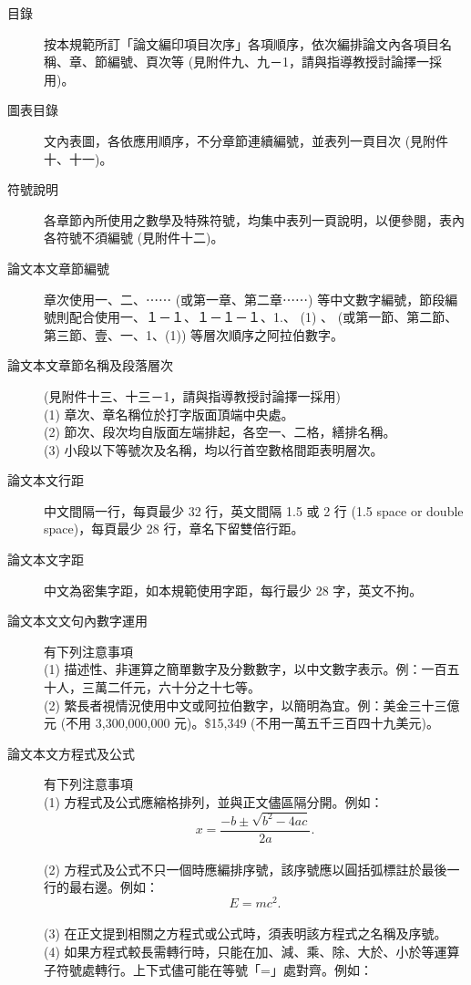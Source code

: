 \begin{description}
\item[目錄] 按本規範所訂「論文編印項目次序」各項順序，依次編排論文內各項目名稱、章、節編號、頁次等 (見附件九、九－1，請與指導教授討論擇一採用)。
\item[圖表目錄] 文內表圖，各依應用順序，不分章節連續編號，並表列一頁目次 (見附件十、十一)。
\item[符號說明] 各章節內所使用之數學及特殊符號，均集中表列一頁說明，以便參閱，表內各符號不須編號 (見附件十二)。
\item[論文本文章節編號] 章次使用一、二、⋯⋯ (或第一章、第二章⋯⋯) 等中文數字編號，節段編號則配合使用一、１－１、１－１－１、1.、 (1) 、 (或第一節、第二節、第三節、壹、一、1、(1)) 等層次順序之阿拉伯數字。
\item[論文本文章節名稱及段落層次] (見附件十三、十三－1，請與指導教授討論擇一採用)\\
(1) 章次、章名稱位於打字版面頂端中央處。\\
(2) 節次、段次均自版面左端排起，各空一、二格，繕排名稱。\\
(3) 小段以下等號次及名稱，均以行首空數格間距表明層次。
\item[論文本文行距] 中文間隔一行，每頁最少 32 行，英文間隔 1.5 或 2 行 (1.5 space or double space)，每頁最少 28 行，章名下留雙倍行距。
\item[論文本文字距] 中文為密集字距，如本規範使用字距，每行最少 28 字，英文不拘。
\item[論文本文文句內數字運用] 有下列注意事項\\
(1) 描述性、非運算之簡單數字及分數數字，以中文數字表示。例：一百五十人，三萬二仟元，六十分之十七等。\\
(2) 繁長者視情況使用中文或阿拉伯數字，以簡明為宜。例：美金三十三億元 (不用 3,300,000,000 元)。\$15,349 (不用一萬五千三百四十九美元)。
\item[論文本文方程式及公式] 有下列注意事項\\
(1) 方程式及公式應縮格排列，並與正文儘區隔分開。例如：
\[ x = \frac{-b \pm \sqrt{b^2 -4ac}}{2a}. \]\\
(2) 方程式及公式不只一個時應編排序號，該序號應以圓括弧標註於最後一行的最右邊。例如：
\begin{equation}
E = mc^2.
\end{equation}\\
(3) 在正文提到相關之方程式或公式時，須表明該方程式之名稱及序號。\\
(4) 如果方程式較長需轉行時，只能在加、減、乘、除、大於、小於等運算子符號處轉行。上下式儘可能在等號「=」處對齊。例如：

\end{description}
